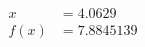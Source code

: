 \documentclass[preview]{standalone}
\begin{document}
\begin{align*}
x &= 4.0629\\f(x) &= 7.8845139
\end{align*}
\end{document}
